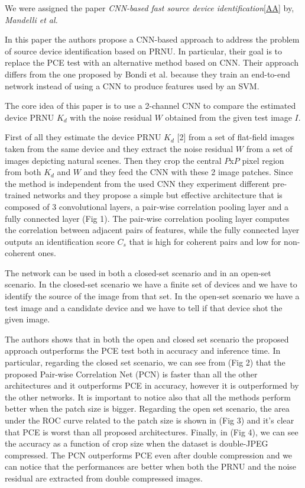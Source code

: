 We were assigned the paper \textit{CNN-based fast source device identification}\ref{AA} by, \textit{Mandelli et al.}

In this paper the authors propose a CNN-based approach to address the problem of source device identification based on PRNU. 
In particular, their goal is to replace the PCE test with an alternative method based on CNN. Their approach differs from the one
proposed by Bondi et al. because they train an end-to-end network instead of using a CNN to produce features used by an SVM.

The core idea of this paper is to use a 2-channel CNN to compare the estimated device PRNU $K_d$ with the noise residual $W$ 
obtained from the given test image $I$.

First of all they estimate the device PRNU $K_d$ [2] from a set of flat-field images taken from the same device and they extract the
noise residual $W$ from a set of images depicting natural scenes.
Then they crop the central $P$x$P$ pixel region from both $K_d$ and $W$ and they feed the CNN with these 2 image patches.
Since the method is independent from the used CNN they experiment different pre-trained networks and they propose a simple but 
effective architecture that is composed of 3 convolutional layers, a pair-wise correlation pooling layer and a fully connected 
layer (Fig 1). The pair-wise correlation pooling layer computes the correlation between adjacent pairs of features, while the
fully connected layer outputs an identification score $C_s$ that is high for coherent pairs and low for non-coherent ones. 

The network can be used in both a closed-set scenario and in an open-set scenario. In the closed-set scenario we have a finite set 
of devices and we have to identify the source of the image from that set. In the open-set scenario we have a test image and a candidate
device and we have to tell if that device shot the given image.

The authors shows that in both the open and closed set scenario the proposed approach outperforms the PCE test both in accuracy 
and inference time. In particular, regarding the closed set scenario, we can see from (Fig 2) that the proposed Pair-wise Correlation Net (PCN) is faster than all the 
other architectures and it outperforms PCE in accuracy, however it is outperformed by the other networks. It is important to notice 
also that all the methods perform better when the patch size is bigger.
Regarding the open set scenario, the area under the ROC curve related to the patch size is shown in (Fig 3) and it's clear that 
PCE is worst than all proposed architectures. 
Finally, in (Fig 4), we can see the accuracy as a function of crop size when the dataset is double-JPEG compressed. The PCN outperforms
PCE even after double compression and we can notice that the performances are better when both the PRNU and the noise residual are 
extracted from double compressed images.
